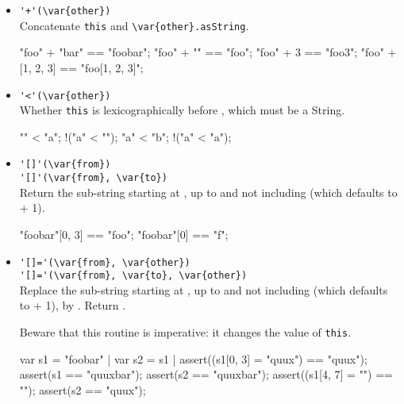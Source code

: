 \begin{itemize}
\item \lstinline|'+'(\var{other})|\\
  Concatenate \lstinline|this| and \lstinline|\var{other}.asString|.
\begin{urbiassert}
"foo" + "bar" == "foobar";
"foo" + "" == "foo";
"foo" + 3 == "foo3";
"foo" + [1, 2, 3] == "foo[1, 2, 3]";
\end{urbiassert}

\item \lstinline|'<'(\var{other})|\\
  Whether \lstinline|this| is lexicographically before ,
  which must be a String.
\begin{urbiassert}
"" < "a";
!("a" < "");
"a" < "b";
!("a" < "a");
\end{urbiassert}

\item \lstinline|'[]'(\var{from})|\\
  \lstinline|'[]'(\var{from}, \var{to})|\\
  Return the sub-string starting at , up to and not including
   (which defaults to  + 1).
\begin{urbiassert}
"foobar"[0, 3] == "foo";
"foobar"[0] == "f";
\end{urbiassert}

\item \lstinline|'[]='(\var{from}, \var{other})|\\
  \lstinline|'[]='(\var{from}, \var{to}, \var{other})|\\
  Replace the sub-string starting at , up to and not including
   (which defaults to  + 1), by .  Return
  .

  Beware that this routine is imperative: it changes the value of
  \lstinline|this|.
\begin{urbiscript}
var s1 = "foobar" | var s2 = s1 |
assert((s1[0, 3] = "quux") == "quux");
assert(s1 == "quuxbar");
assert(s2 == "quuxbar");
assert((s1[4, 7] = "") == "");
assert(s2 == "quux");
\end{urbiscript}
\end{itemize}


